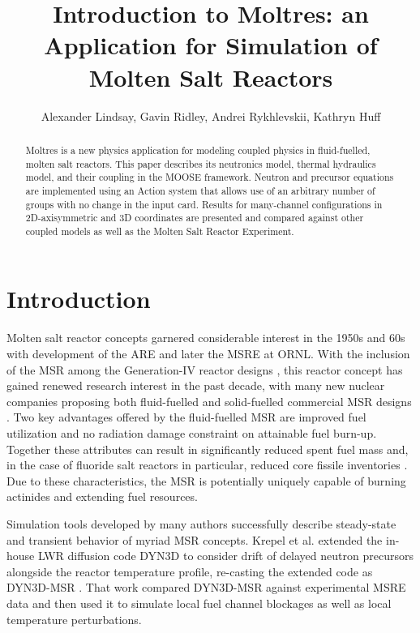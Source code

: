 \documentclass{article}
\title{Introduction to Moltres: an Application for Simulation of Molten Salt Reactors}
\author{Alexander Lindsay, Gavin Ridley, Andrei Rykhlevskii, Kathryn Huff}
\let\Oldsection\section
\renewcommand{\section}{\FloatBarrier\Oldsection}
\begin{document}
\maketitle

\begin{abstract}

Moltres is a new physics application for modeling coupled physics in
fluid-fuelled, molten salt reactors. This paper describes its neutronics model,
thermal hydraulics model, and their coupling in the MOOSE framework. Neutron
and precursor equations are implemented using an Action system that allows use
of an arbitrary number of groups with no change in the input card. Results for
many-channel configurations in 2D-axisymmetric and 3D coordinates are presented
and compared against other coupled models as well as the Molten Salt Reactor
Experiment.

\end{abstract}

\section{Introduction}

Molten salt reactor concepts garnered considerable interest in the 1950s and 60s
with development of the \gls{ARE} and later the \gls{MSRE} at \gls{ORNL}.  With
the inclusion of the \gls{MSR} among the Generation-IV reactor designs
\cite{gif_generation_2008,gif_generation_2015}, this reactor concept has gained
renewed research interest in the past decade, with many new nuclear companies
proposing both fluid-fuelled and solid-fuelled commercial \gls{MSR} designs
\cite{hyde_liquid_2015,leblanc_integral_2015,thorcon_-able_2017,scarlat_design_2014,transatomic_power_corporation_neutronics_2016}.
Two key advantages offered by the fluid-fuelled \gls{MSR} are improved fuel
utilization and no radiation damage constraint on attainable fuel
burn-up. Together these attributes can result in significantly reduced spent
fuel mass and, in the case of fluoride salt reactors in particular, reduced core
fissile inventories \cite{gif_generation_2008,gif_generation_2015}.  Due to
these characteristics, the \gls{MSR} is potentially uniquely capable of burning
actinides and extending fuel resources.

Simulation tools developed by many authors successfully describe steady-state and
transient behavior of myriad \gls{MSR} concepts. Krepel et al. extended the in-house \gls{LWR}
diffusion code DYN3D to consider drift of delayed neutron precursors alongside
the reactor temperature profile, re-casting the extended code as
DYN3D-MSR \cite{krepel_dyn3d-msr_2007}. That work compared DYN3D-MSR against
experimental \gls{MSRE} data and then used it to simulate local fuel channel
blockages as well as local temperature perturbations.
\end{document}
